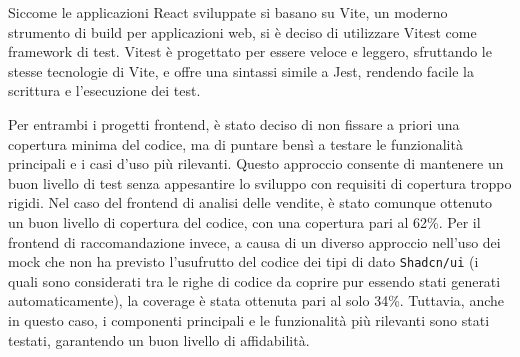 Siccome le applicazioni React sviluppate si basano su Vite, un moderno strumento di build per applicazioni web, si è deciso di utilizzare Vitest come framework di test. Vitest è progettato per essere veloce e leggero, sfruttando le stesse tecnologie di Vite, e offre una sintassi simile a Jest, rendendo facile la scrittura e l'esecuzione dei test.

Per entrambi i progetti frontend, è stato deciso di non fissare a priori una copertura minima del codice, ma di puntare bensì a testare le funzionalità principali e i casi d'uso più rilevanti. Questo approccio consente di mantenere un buon livello di test senza appesantire lo sviluppo con requisiti di copertura troppo rigidi.
Nel caso del frontend di analisi delle vendite, è stato comunque ottenuto un buon livello di copertura del codice, con una copertura pari al 62\%. Per il frontend di raccomandazione invece, a causa di un diverso approccio nell'uso dei mock che non ha previsto l'usufrutto del codice dei tipi di dato \texttt{Shadcn/ui} (i quali sono considerati tra le righe di codice da coprire pur essendo stati generati automaticamente), la coverage è stata ottenuta pari al solo 34\%. Tuttavia, anche in questo caso, i componenti principali e le funzionalità più rilevanti sono stati testati, garantendo un buon livello di affidabilità.
